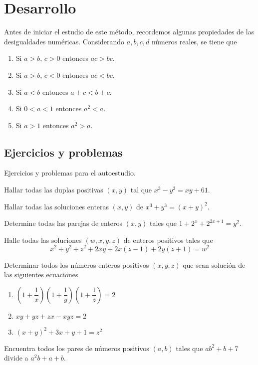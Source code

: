 \section{Desarrollo}

Antes de iniciar el estudio de este método, recordemos algunas propiedades de las desigualdades numéricas.
Considerando $a, b, c, d$ números reales, se tiene que
\begin{multicols}{2}
    \begin{enumerate}
        \item Si $a > b$, $c > 0$ entonces $ac > bc$.
        \item Si $a > b$, $c < 0$ entonces $ac < bc$.
        \item Si $a < b$ entonces $a + c < b + c$.
        \item Si $0 < a < 1$ entonces $a^2 < a$.
        \item Si $a > 1$ entonces $a^2 > a$.
    \end{enumerate}
\end{multicols}


\subsection{Ejercicios y problemas}

Ejercicios y problemas para el autoestudio.

\begin{exercise}
    Hallar todas las duplas positivas $(x,y)$ tal que $x^3 - y^3 = xy + 61$.
\end{exercise}

\begin{exercise}
    Hallar todas las soluciones enteras $(x,y)$ de $x^3 + y^3 = (x + y)^2$.
\end{exercise}

\begin{exercise}
    Determine todas las parejas de enteros $(x, y)$ tales que $1 + 2^x + 2^{2x + 1} = y^2$.
\end{exercise}

\begin{exercise}
    Halle todas las soluciones $(w,x,y,z)$ de enteros positivos tales que
    \[
        x^2 + y^2 + z^2 + 2xy + 2x(z - 1) + 2y(z + 1) = w^2
    \]
\end{exercise}

\begin{exercise}
    Determinar todos los números enteros positivos $(x,y,z)$ que sean solución de las siguientes ecuaciones
    \begin{enumerate}
        \item $\left(1 + \dfrac{1}{x}\right)\left(1 + \dfrac{1}{y}\right)\left(1 + \dfrac{1}{z}\right) = 2$
        \item $xy + yz + zx - xyz = 2$
        \item $(x + y)^2 + 3x + y + 1 = z^2$
    \end{enumerate}
\end{exercise}

\begin{exercise}
    Encuentra todos los pares de números positivos $(a, b)$ tales que $ab^2 + b + 7$ divide a $a^2 b + a + b$.
\end{exercise}